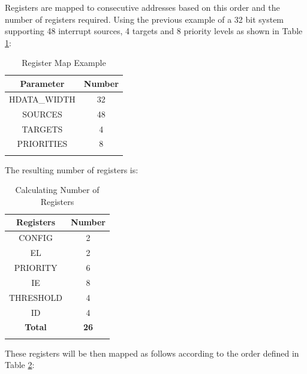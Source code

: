 Registers are mapped to consecutive addresses based on this order and the
number of registers required. Using the previous example of a 32 bit system supporting 48 interrupt sources, 4 targets and 8 priority levels as shown in Table \ref{tab:REGMAPEX}:

\begin{longtable}[c]{@{}cc@{}}	
		\toprule 
		\textbf{Parameter} & \textbf{Number}\\
		\midrule 
		\endhead
		HDATA\_WIDTH & 32\\
		SOURCES & 48\\
		TARGETS & 4\\
		PRIORITIES & 8\\
		\bottomrule 	
 
	\caption{Register Map Example}
	\label{tab:REGMAPEX}
\end{longtable}

The resulting number of registers is:

\begin{longtable}[c]{@{}cc@{}}	
		\toprule 
		\textbf{Registers} & \textbf{Number}\\
		\midrule 
		\endhead
		CONFIG & 2\\
		EL & 2\\
		PRIORITY & 6\\
		IE & 8\\
		THRESHOLD & 4\\
		ID & 4\\
		\midrule
		\textbf{Total} & \textbf{26}\\
		\bottomrule 	
	\caption{Calculating Number of Registers}
	\label{tab:REGMAPNUM}
\end{longtable}


These registers will be then mapped as follows according to the order
defined in Table \ref{tab:REGMAPNUM}:

